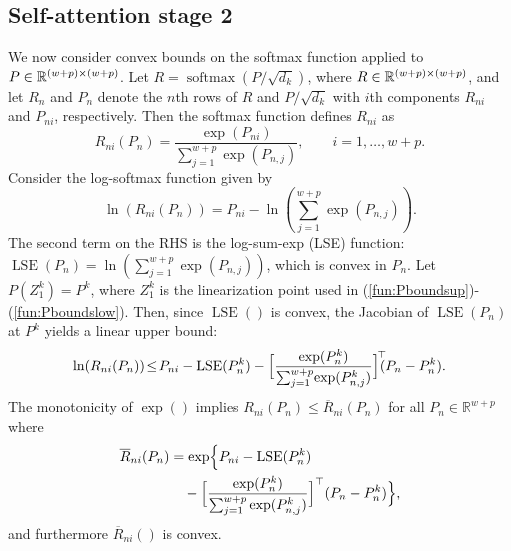 \documentclass{ifacconf}
\DeclareMathOperator{\softmax}{softmax}
\DeclareMathOperator{\LSE}{LSE}
\begin{document}
\subsection{Self-attention stage 2}\label{sec:stage2}
We now consider convex bounds on the softmax function applied to \(P \in \smash{\mathbb{R}^{(w+p) \times (w+p)}}\). Let  
$R = \softmax(P/\sqrt{d_k})$, where $R\in \smash{\mathbb{R}^{(w+p) \times (w+p)}} $, and let $R_n$ and $P_n$ denote the $n$th rows of $R$ and $P/\sqrt{d_k}$ with $i$th components $R_{ni}$ and $P_{ni}$, respectively. 
Then the softmax function defines 
$R_{ni}$ as
\begin{equation}
\label{fun:RPi}
    R_{ni}(P_{n}) = \frac{\exp(P_{ni})}{\sum_{j=1}^{w+p} \exp(P_{n,j})} ,
\qquad i = 1,\ldots,w+p. 
\end{equation}
Consider the log-softmax function given by
\[%
 \ln (R_{ni}(P_{n})) = P_{ni}-\ln(\sum_{j=1}^{w+p} \exp(P_{n,j})) .
\]%
The second term on the RHS is the log-sum-exp (LSE) function:
$\LSE(P_{n}) = \ln(\sum_{j=1}^{w+p} \exp(P_{n,j}))$, which is convex in $P_n$.
%
Let \(P(Z_1^k) = P^k\), where \(Z_1^k\) is the linearization point used in (\ref{fun:Pboundsup})-(\ref{fun:Pboundslow}). Then, since $\LSE()$ is convex, the Jacobian of $\LSE(P_n)$ at $P^k$ yields a linear upper bound:
\[%
\ln (R_{ni}(P_{n})) \!\leq\! P_{ni}-\LSE(P_{n}^k) 
-\Bigl[\frac{\exp(P_{n}^k)}{\sum_{j =1}^{w+p} \!\exp(P_{n,j}^k)}\Bigr]^{\!\top}\!\!\!(P_{n}-P_{n}^k).
\]%
The monotonicity of $\exp()$ implies 
$R_{ni}(P_n)\leq \overline{R}_{ni}(P_{n})$ for all $P_n\in \mathbb{R}^{w+p}$
where 
\begin{align}
\overline{R}_{ni}(P_{n}) &= 
\exp \Bigl\{ P_{ni} - \LSE(P_{n}^k) 
\nonumber \\
&\quad -\Bigl[\frac{\exp(P_{n}^k)}{\sum_{j =1}^{w+p} \exp(P_{n,j}^k)}\Bigr]^{\top}(P_{n}-P_{n}^k)\Bigr\},
\label{eq:softmax_upperbnd}
\end{align}
and furthermore $\overline{R}_{ni}()$ is convex.
\end{document}

